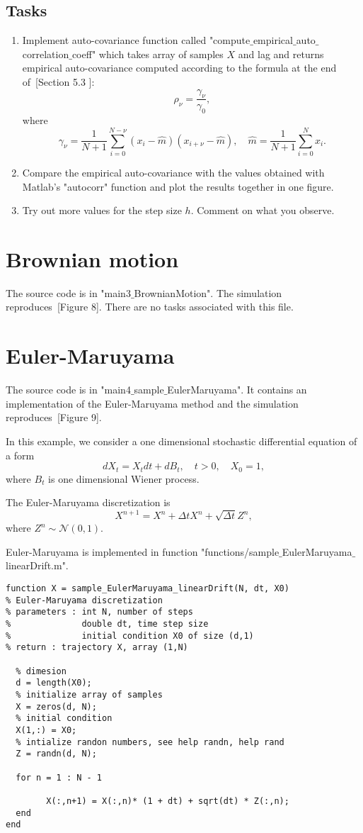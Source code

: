 \documentclass{scrartcl}
\begin{document}
\subsection{Tasks}
\begin{enumerate}
\item Implement auto-covariance function called "compute$\_$empirical$\_$auto$\_$correlation$\_$coeff" which takes array of samples $X$ and lag and returns empirical auto-covariance computed according to the formula at the end of~\cite{sanz2014markov}[Section 5.3 ]:
\[
\rho_{\nu} = \frac{\gamma_{\nu}}{\gamma_0},
\]
where 
\[
\gamma_{\nu} = \frac{1}{N+1}\sum_{i=0}^{N-\nu}(x_i - \hat{m})(x_{i+\nu} - \hat{m}), \quad \hat{m} = \frac{1}{N+1}\sum_{i=0}^N x_i.
\]
\item Compare the empirical auto-covariance with the values obtained with Matlab's "autocorr" function and plot the results together in one figure.
\item Try out more values for the step size $h$. Comment on what you observe.
\end{enumerate}


\section{Brownian motion}

The source code is in "main3$\_$BrownianMotion". The simulation reproduces~\cite{sanz2014markov}[Figure 8]. There are no tasks associated with this file.



\section{Euler-Maruyama}

The source code is in "main4$\_$sample$\_$EulerMaruyama". It contains an implementation of the Euler-Maruyama method and the simulation reproduces~\cite{sanz2014markov}[Figure 9].

In this example, we consider a one dimensional stochastic differential equation of a form 
\[
dX_t = X_t dt + dB_t, \quad t>0, \quad X_0=1,
\]
where  $B_t$ is one dimensional Wiener process. 

The Euler-Maruyama discretization is 
\[
X^{n+1} = X^n + \Delta tX^n + \sqrt{\Delta t} Z^n,
\]
where $Z^n\sim \mathcal{N}(0,1)$. 

Euler-Maruyama is implemented in function "functions/sample$\_$EulerMaruyama$\_$linearDrift.m".
\begin{verbatim}
function X = sample_EulerMaruyama_linearDrift(N, dt, X0)
% Euler-Maruyama discretization
% parameters : int N, number of steps
%              double dt, time step size
%              initial condition X0 of size (d,1)
% return : trajectory X, array (1,N)
    
  % dimesion
  d = length(X0);
  % initialize array of samples
  X = zeros(d, N);
  % initial condition
  X(1,:) = X0;
  % intialize randon numbers, see help randn, help rand
  Z = randn(d, N);
    
  for n = 1 : N - 1
                
        X(:,n+1) = X(:,n)* (1 + dt) + sqrt(dt) * Z(:,n);        
  end
end
\end{verbatim}
\end{document}
